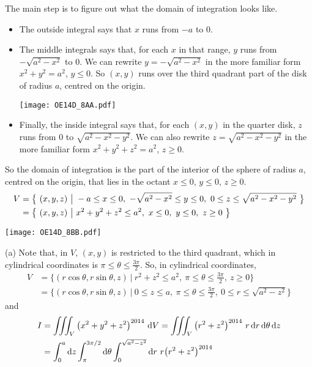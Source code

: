 \begin{solution}
The main step is to figure out what the domain of integration 
looks like. 
\begin{itemize}
\item
The outside integral says that $x$ runs from $-a$ to $0$. 
\item
The middle integrals says that, for each $x$ in that range, $y$ runs
from $-\sqrt{a^2-x^2}$ to $0$. We can rewrite $y=-\sqrt{a^2-x^2}$
in the more familiar form $x^2+y^2=a^2$, $y\le 0$. So $(x,y)$
runs over the third quadrant part of the disk of radius $a$, centred 
on the origin.

\begin{center}
\texttt{[image: OE14D\_8AA.pdf]}
\end{center}

\item
Finally, the inside integral says that, for each $(x,y)$ in the quarter disk,
$z$ runs from $0$ to $\sqrt{a^2-x^2-y^2} $. We can also rewrite
$z=\sqrt{a^2-x^2-y^2}$ in the more familiar form $x^2+y^2+z^2=a^2$, $z\ge 0$.
\end{itemize}
So the domain of integration is the part of the interior of the sphere
of radius $a$, centred on the origin, that lies in the octant
$x\le 0$, $y\le 0$, $z\ge 0$.
\begin{align*}
V&=\Set{(x,y,z)}{-a\le x\le 0,\ -\sqrt{a^2-x^2}\le y\le 0,\ 
                 0\le z\le\sqrt{a^2-x^2-y^2} } \\
&=\Set{(x,y,z)}{x^2+y^2+z^2\le a^2,\ x\le 0,\ y\le 0,\ z\ge 0 }
\end{align*}

\begin{center}
\texttt{[image: OE14D\_8BB.pdf]}
\end{center}


(a) Note that, in $V$, $(x,y)$ is restricted to the third
quadrant, which in cylindrical coordinates 
is $\pi\le\theta\le\frac{3\pi}{2}$. So, in cylindrical coordinates,
\begin{align*}
V&=\Big\{(r\cos\theta,r\sin\theta,z)\ \Big|\ 
          r^2+z^2\le a^2,\ \pi\le\theta\le\frac{3\pi}{2},\ z\ge 0 \Big\} \\
 &=\Big\{(r\cos\theta,r\sin\theta,z)\ \Big|\ 0\le z\le a,\ 
          \pi\le\theta\le\frac{3\pi}{2},\ 0\le r\le\sqrt{a^2-z^2} \Big\}
\end{align*}
and
\begin{align*}
I&= \tripInt_V \big(x^2+y^2+z^2\big)^{2014}\ \dee{V}
  = \tripInt_V \big(r^2+z^2\big)^{2014}\ r\,\dee{r}\,\dee{\theta}\,\dee{z} \\
&=\int_0^a \dee{z}\int_{\pi}^{3\pi/2}\dee{\theta} 
     \int_0^{\sqrt{a^2-z^2}}\dee{r}\ r\big(r^2+z^2\big)^{2014}
\end{align*}


\end{solution}
